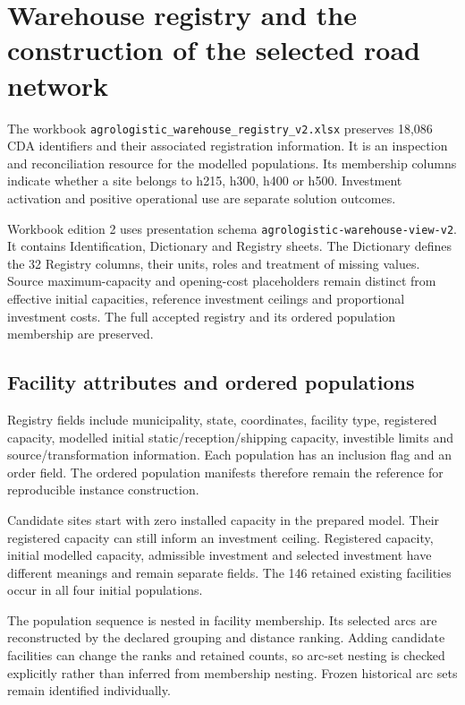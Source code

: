 \documentclass[11pt,a4paper]{article}
\newcommand{\code}[1]{{\small\texttt{#1}}}
\begin{document}
\section{Warehouse registry and the construction of the selected road network}
\label{app:registry}

The workbook \code{agrologistic\_warehouse\_registry\_v2.xlsx} preserves 18,086 CDA identifiers and their associated registration information. It is an inspection and reconciliation resource for the modelled populations. Its membership columns indicate whether a site belongs to h215, h300, h400 or h500. Investment activation and positive operational use are separate solution outcomes.

Workbook edition 2 uses presentation schema \code{\nolinkurl{agrologistic-warehouse-view-v2}}. It contains Identification, Dictionary and Registry sheets. The Dictionary defines the 32 Registry columns, their units, roles and treatment of missing values. Source maximum-capacity and opening-cost placeholders remain distinct from effective initial capacities, reference investment ceilings and proportional investment costs. The full accepted registry and its ordered population membership are preserved.

\subsection{Facility attributes and ordered populations}

Registry fields include municipality, state, coordinates, facility type, registered capacity, modelled initial static/reception/shipping capacity, investible limits and source/transformation information. Each population has an inclusion flag and an order field. The ordered population manifests therefore remain the reference for reproducible instance construction.

Candidate sites start with zero installed capacity in the prepared model. Their registered capacity can still inform an investment ceiling. Registered capacity, initial modelled capacity, admissible investment and selected investment have different meanings and remain separate fields. The 146 retained existing facilities occur in all four initial populations.

The population sequence is nested in facility membership. Its selected arcs are reconstructed by the declared grouping and distance ranking. Adding candidate facilities can change the ranks and retained counts, so arc-set nesting is checked explicitly rather than inferred from membership nesting. Frozen historical arc sets remain identified individually.
\end{document}
